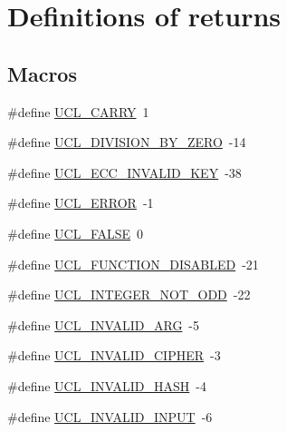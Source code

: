 \hypertarget{group___u_c_l___r_e_t_u_r_n}{}\section{Definitions of returns}
\label{group___u_c_l___r_e_t_u_r_n}
\subsection*{Macros}
\begin{DoxyCompactItemize}
\item
\#define \hyperlink{group___u_c_l___r_e_t_u_r_n_ga0dce5f26cc3acf0bcca51853edc2b10f}{U\+C\+L\+\_\+\+C\+A\+R\+RY}~1
\item
\#define \hyperlink{group___u_c_l___r_e_t_u_r_n_gafc7aaea99d505ed3f41233839c2cb931}{U\+C\+L\+\_\+\+D\+I\+V\+I\+S\+I\+O\+N\+\_\+\+B\+Y\+\_\+\+Z\+E\+RO}~-\/14
\item
\#define \hyperlink{group___u_c_l___r_e_t_u_r_n_gae119e5730135c867480f836a9c784583}{U\+C\+L\+\_\+\+E\+C\+C\+\_\+\+I\+N\+V\+A\+L\+I\+D\+\_\+\+K\+EY}~-\/38
\item
\#define \hyperlink{group___u_c_l___r_e_t_u_r_n_gafd05d0634dc32843163713aaed20563a}{U\+C\+L\+\_\+\+E\+R\+R\+OR}~-\/1
\item
\#define \hyperlink{group___u_c_l___r_e_t_u_r_n_gad3a862f5f0e7cc34da71225a3438530e}{U\+C\+L\+\_\+\+F\+A\+L\+SE}~0
\item
\#define \hyperlink{group___u_c_l___r_e_t_u_r_n_ga9027ff13a3693edb80f434637854b404}{U\+C\+L\+\_\+\+F\+U\+N\+C\+T\+I\+O\+N\+\_\+\+D\+I\+S\+A\+B\+L\+ED}~-\/21
\item
\#define \hyperlink{group___u_c_l___r_e_t_u_r_n_ga363dbaa89915c7ec570e0746dd6db266}{U\+C\+L\+\_\+\+I\+N\+T\+E\+G\+E\+R\+\_\+\+N\+O\+T\+\_\+\+O\+DD}~-\/22
\item
\#define \hyperlink{group___u_c_l___r_e_t_u_r_n_ga5e4b3a2e5cbcf09c2486f2e9d793a47b}{U\+C\+L\+\_\+\+I\+N\+V\+A\+L\+I\+D\+\_\+\+A\+RG}~-\/5
\item
\#define \hyperlink{group___u_c_l___r_e_t_u_r_n_ga4b7d4436f37b1e54815006bde457cb63}{U\+C\+L\+\_\+\+I\+N\+V\+A\+L\+I\+D\+\_\+\+C\+I\+P\+H\+ER}~-\/3
\item
\#define \hyperlink{group___u_c_l___r_e_t_u_r_n_ga6d7e5e9335ae078f64082b7f5b2ccb82}{U\+C\+L\+\_\+\+I\+N\+V\+A\+L\+I\+D\+\_\+\+H\+A\+SH}~-\/4
\item
\#define \hyperlink{group___u_c_l___r_e_t_u_r_n_ga0ce984d38effddf33eb42be5ff3d87cf}{U\+C\+L\+\_\+\+I\+N\+V\+A\+L\+I\+D\+\_\+\+I\+N\+P\+UT}~-\/6

\end{DoxyCompactItemize}
